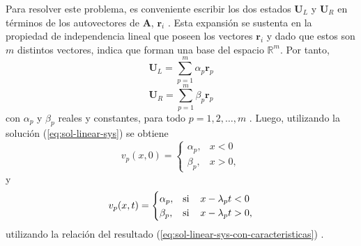 Para resolver este problema, es conveniente escribir los dos estados $\mathbf{U}_L$ y  $\mathbf{U}_R$ en términos de los autovectores de $\mathbf{A}$, $\mathbf{r}_i$ \cite{Leveque}. Esta expansión se sustenta en la propiedad de independencia lineal que poseen los vectores $\mathbf{r}_i$ y dado que estos son $m$ distintos vectores,  indica que forman una base del espacio $\mathbb{R}^{m}$. Por tanto,
\begin{equation}
	\mathbf{U}_L = \sum_{p=1}^{m} \alpha_{p} \mathbf{r}_{p}
\end{equation}
\begin{equation}
	\mathbf{U}_R = \sum_{p=1}^{m} \beta_{p} \mathbf{r}_{p}
\end{equation}
con $\alpha_p$ y $\beta_{p}$ reales y constantes, para todo $p=1,2,\dots, m$ \cite{Leveque}.
Luego, utilizando la solución (\ref{eq:sol-linear-sys}) se obtiene
\begin{equation}
	v_p(x,0) = 
	\begin{cases}
		\alpha_p, & x < 0 \\
		\beta_{p}, & x > 0,
	\end{cases}
\end{equation}
y
\begin{equation}
	v_p(x,t) = 
	\begin{cases}
		\alpha_p, & \text{si} \hspace{4mm} x - \lambda_{p} t < 0 \\
		\beta_{p}, & \text{si} \hspace{4mm} x - \lambda_{p} t > 0,
	\end{cases}
\end{equation}
utilizando la relación del resultado (\ref{eq:sol-linear-sys-con-caracteristicas}) \cite{Leveque}. 